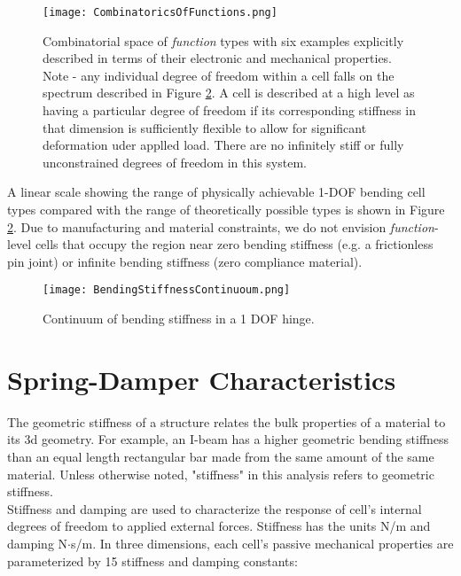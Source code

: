 {\begin{figure}
  \texttt{[image: CombinatoricsOfFunctions.png]}
  \caption{Combinatorial space of \textit{function} types with six examples explicitly described in terms of their electronic and mechanical properties.  Note - any individual degree of freedom within a cell falls on the spectrum described in Figure \ref{fig:BendingStiffnessContinuoum}.  A cell is described at a high level as having a particular degree of freedom if its corresponding stiffness in that dimension is sufficiently flexible to allow for significant deformation uder applled load.  There are no infinitely stiff or fully unconstrained degrees of freedom in this system.}
  \label{fig:CombinatoricsOfFunctions}
\end{figure}

A linear scale showing the range of physically achievable 1-DOF bending cell types compared with the range of theoretically possible types is shown in Figure \ref{fig:BendingStiffnessContinuoum}.  Due to manufacturing and material constraints, we do not envision \textit{function}-level cells that occupy the region near zero bending stiffness (e.g. a frictionless pin joint) or infinite bending stiffness (zero compliance material).

\begin{figure}
  \texttt{[image: BendingStiffnessContinuoum.png]}
  \caption{Continuum of bending stiffness in a 1 DOF hinge.}
  \label{fig:BendingStiffnessContinuoum}
\end{figure}

\section{Spring-Damper Characteristics}

The geometric stiffness of a structure relates the bulk properties of a material to its 3d geometry.  For example, an I-beam has a higher geometric bending stiffness than an equal length rectangular bar made from the same amount of the same material.  Unless otherwise noted, "stiffness" in this analysis refers to geometric stiffness.\\

Stiffness and damping are used to characterize the response of cell's internal degrees of freedom to applied external forces.  Stiffness has the units N/m and damping N$\cdot$s/m.  In three dimensions, each cell's passive mechanical properties are parameterized by 15 stiffness and damping constants:

}
